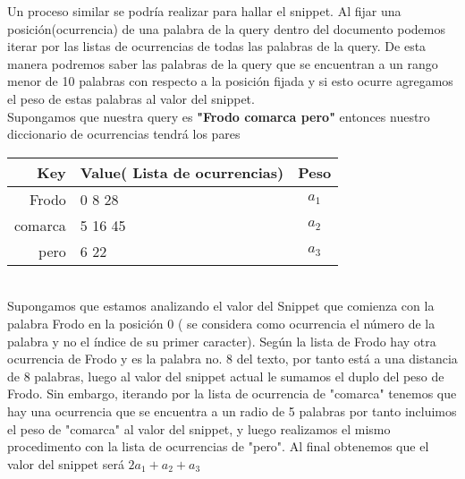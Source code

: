 \documentclass[12pt]{article}
\begin{document}
Un proceso similar se podr\'ia realizar para hallar el snippet. Al fijar una posici\'on(ocurrencia) de una palabra de la query dentro del documento podemos iterar por las listas de ocurrencias de todas las palabras de la query. De esta manera podremos saber las palabras de la query que se encuentran a un rango menor de 10 palabras con respecto a la posici\'on fijada y si esto ocurre agregamos el peso de estas palabras al valor del snippet.\\   
 
  Supongamos que nuestra query es \textbf{ "Frodo comarca pero" } entonces nuestro diccionario de ocurrencias tendr\'a los pares \\
  
  \begin{tabular}{|r|l|c|}
  	\hline
  	Key     &   Value( Lista de ocurrencias)  &  Peso  \\
  	\hline 
  	Frodo   &      0   8   28    &   $a_{1}$ \\
  	comarca  &    5   16   45   &   $a_{2}$ \\
  	pero   &   6  22       &   $a_{3}$   \\
  	\hline
  \end{tabular}  \\
  
  Supongamos que estamos analizando el valor del Snippet que comienza con la palabra Frodo en la posici\'on 0 ( se considera como ocurrencia el n\'umero de la palabra y no el \'indice de su primer caracter).
  Seg\'un la lista de Frodo hay otra ocurrencia de Frodo y es la palabra no. 8 del texto, por tanto est\'a a una distancia de 8 palabras, luego al valor del snippet actual le sumamos el duplo del peso de Frodo. Sin embargo, iterando por la lista de ocurrencia de "comarca" tenemos que hay una ocurrencia que se encuentra a un radio de 5 palabras por tanto incluimos el peso de "comarca" al valor del snippet, y luego realizamos el mismo procedimento con la lista de ocurrencias de "pero". Al final obtenemos que el valor del snippet ser\'a $2a_1+a_2+a_3$
\end{document}
